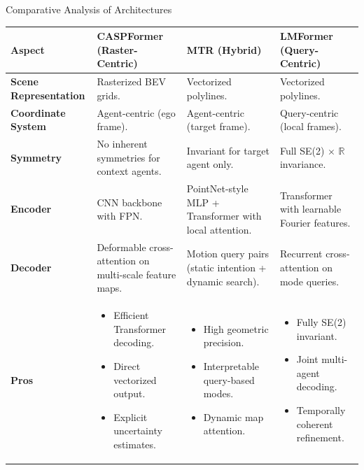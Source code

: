 \documentclass[10pt,aspectratio=169]{beamer}
\newcommand{\greenoplus}{\textcolor{mygreen}{\ding{51}}}
\begin{document}
\begin{frame}{Comparative Analysis of Architectures}
    \begin{table}
    \centering
    \tiny
    \renewcommand{\arraystretch}{1.2}
    \begin{tabular}{|p{1.9cm}|p{3.9cm}|p{3.9cm}|p{3.9cm}|}
        \hline
        \textbf{Aspect} & \textbf{CASPFormer (Raster-Centric)} & \textbf{MTR (Hybrid)} & \textbf{LMFormer (Query-Centric)} \\
        \hline
        \textbf{Scene Representation} & Rasterized BEV grids. & Vectorized polylines. & Vectorized polylines. \\
        \hline
        \textbf{Coordinate System} & Agent-centric (ego frame). & Agent-centric (target frame). & Query-centric (local frames). \\
        \hline
        \textbf{Symmetry} & No inherent symmetries for context agents. & Invariant for target agent only. & Full SE(2) \(\times\) \(\mathbb{R}\) invariance. \\
        \hline
        \textbf{Encoder} & CNN backbone with FPN. & PointNet-style MLP + Transformer with local attention. & Transformer with learnable Fourier features. \\
        \hline
        \textbf{Decoder} & Deformable cross-attention on multi-scale feature maps. & Motion query pairs (static intention + dynamic search). & Recurrent cross-attention on mode queries. \\
        \hline
        \textbf{Pros} \greenoplus &
        \begin{itemize}
            \item Efficient Transformer decoding.
            \item Direct vectorized output.
            \item Explicit uncertainty estimates.
        \end{itemize} &
        \begin{itemize}
            \item High geometric precision.
            \item Interpretable query-based modes.
            \item Dynamic map attention.
        \end{itemize} &
        \begin{itemize}
            \item Fully SE(2) invariant.
            \item Joint multi-agent decoding.
            \item Temporally coherent refinement.

\end{itemize}
\end{tabular}
\end{table}
\end{frame}
\end{document}

